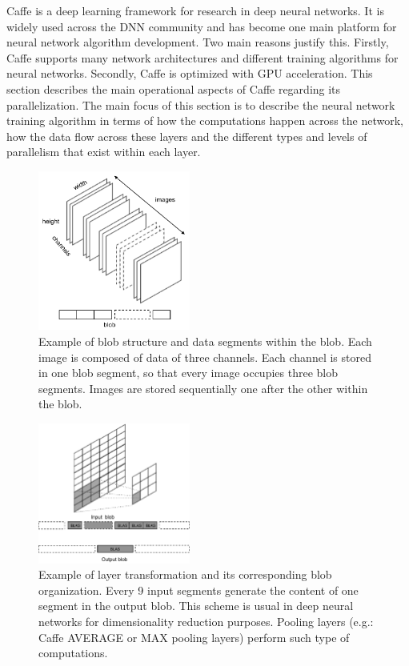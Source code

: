 Caffe is a deep learning framework for research in deep neural
networks. It is widely used across the DNN community
and has become one main platform for neural network algorithm development. 
Two main reasons justify this. Firstly, Caffe supports
many network architectures and different training algorithms for
neural networks. Secondly, Caffe is optimized with GPU acceleration.
This section describes the main operational aspects of Caffe
regarding its parallelization. 
The main focus of this section is to describe the neural network 
training algorithm in terms of how the computations happen across 
the network, how the data flow across these layers 
and the different types and levels of parallelism that exist within each layer.


\begin{figure}[]
\centering
\includegraphics[width=5cm]{figures/blob1.pdf}
\caption{Example of blob structure and data segments within the blob. Each image is composed of data of three channels. Each channel is stored in one blob segment, so that every image occupies three blob segments. Images are stored sequentially one after the other within the blob.}
\label{fig-blob}
\end{figure}

\begin{figure}[]
\centering
\includegraphics[width=5cm]{figures/blob2.pdf}
\caption{Example of layer transformation and its corresponding blob organization. Every 9 input segments generate the content of one segment in the output blob. This scheme is usual in deep neural networks for dimensionality reduction purposes. Pooling layers (e.g.: Caffe AVERAGE or MAX pooling layers) perform such type of computations.}
\label{fig-blob-trans}
\end{figure}

